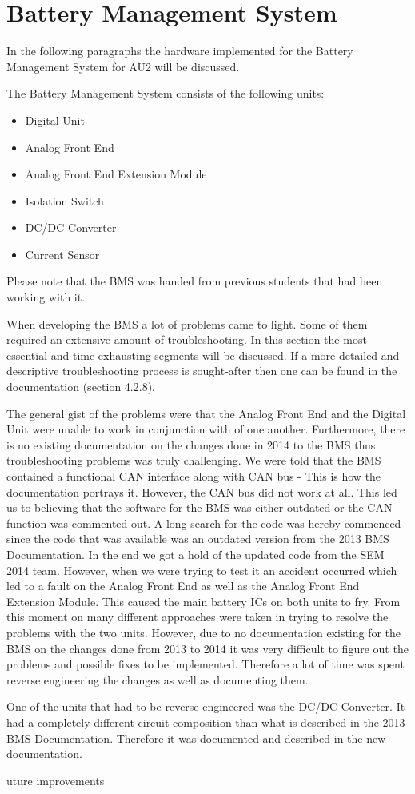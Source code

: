 \section{Battery Management System}
In the following paragraphs the hardware implemented for the Battery Management System for AU2 will be discussed. 

The Battery Management System consists of the following units:
\begin{itemize}
	\item{Digital Unit}
	\item{Analog Front End}
	\item{Analog Front End Extension Module}
	\item{Isolation Switch}
	\item{DC/DC Converter}
	\item{Current Sensor}
\end{itemize}

Please note that the BMS was handed from previous students that had been working with it. 

When developing the BMS a lot of problems came to light. Some of them required an extensive amount of troubleshooting. In this section the most essential and time exhausting segments will be discussed. If a more detailed and descriptive troubleshooting process is sought-after then one can be found in the documentation\cite{AU2} (section 4.2.8).

The general gist of the problems were that the Analog Front End and the Digital Unit were unable to work in conjunction with of one another. Furthermore, there is no existing documentation on the changes done in 2014 to the BMS thus troubleshooting problems was truly challenging.
We were told that the BMS contained a functional CAN interface along with CAN bus - This is how the documentation portrays it. However, the CAN bus did not work at all. This led us to believing that the software for the BMS was either outdated or the CAN function was commented out. A long search for the code was hereby commenced since the code that was available was an outdated version from the 2013 BMS Documentation\cite{BMSDocumentation}. In the end we got a hold of the updated code from the SEM 2014 team. However, when we were trying to test it an accident occurred which led to a fault on the Analog Front End as well as the Analog Front End Extension Module. This caused the main battery ICs on both units to fry.
From this moment on many different approaches were taken in trying to resolve the problems with the two units. However, due to no documentation existing for the BMS on the changes done from 2013 to 2014 it was very difficult to figure out the problems and possible fixes to be implemented. Therefore a lot of time was spent reverse engineering the changes as well as documenting them. 

One of the units that had to be reverse engineered was the DC/DC Converter. It had a completely different circuit composition than what is described in the 2013 BMS Documentation\cite{BMSDocumentation}. Therefore it was documented and described in the new documentation\cite{AU2}. 

uture improvements